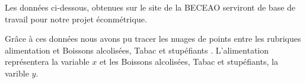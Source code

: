 \documentclass[12pt]{report}
\begin{document}
Les données ci-dessous, obtenues sur le site de la BECEAO serviront de base de travail pour notre projet éconmétrique.



Grâce à ces données nous avons pu tracer les nuages de points entre les rubriques \guillemetleft alimentation \guillemetright et \guillemetleft Boissons alcolisées, Tabac et stupéfiants \guillemetright. L'alimentation représentera la variable $x$ et les Boissons alcolisées, Tabac et stupéfiants, la varible $y$.


\end{document}
